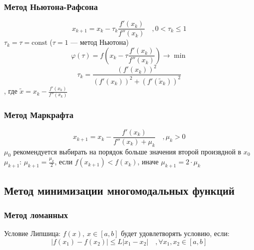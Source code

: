 \documentclass[english]{article}
\newcommand{\const}{\text{const}}
\theoremstyle{plain}
\theoremstyle{remark}
\theoremstyle{definition}
\begin{document}
\subsubsection{Метод Ньютона-Рафсона}
\label{sec:org7d0ce42}
\[ x_{k + 1} = x_k - \tau_k\frac{f'(x_k)}{f''(x_k)}\quad, 0 < \tau_k \le 1 \]
\(\tau_k = \tau = \const\) (\(\tau = 1\) --- метод Ньютона)
\[ \varphi(\tau) = f(x_k - \tau\frac{f'(x_k)}{f''(x_k)}) \to \min \]
\[ \tau_k = \frac{(f'(x_k))^2}{(f'(x_k))^2 + (f'(\tilde{x}_k))^2} \]
, где \(\tilde{x} = x_k - \frac{f'(x_k)}{f''(x_k)}\)
\subsubsection{Метод Маркрафта}
\label{sec:org99f723a}
\[ x_{k + 1} = x_k - \frac{f'(x_k)}{f''(x_k) + \mu_k}\quad,\mu_k > 0 \]
\(\mu_0\) рекомендуется выбирать на порядок больше значения второй произвдной в \(x_0\) \\
\(\mu_{k + 1}\): \(\mu_{k + 1} = \frac{\mu_k}{2}\), если \(f(x_{k + 1}) < f(x_k)\), иначе \(\mu_{k + 1} = 2\cdot\mu_k\)
\subsection{Метод минимизации многомодальных функций}
\label{sec:orgd7c2796}
\subsubsection{Метод ломанных}
\label{sec:org5f3942a}
Условие Липшица: \(f(x),\ x\in [a, b]\) будет удовлетворять условию, если:
\[ |f(x_1) - f(x_2)| \le L|x_1 - x_2|\quad,\forall x_1, x_2 \in [a, b] \]
\end{document}
